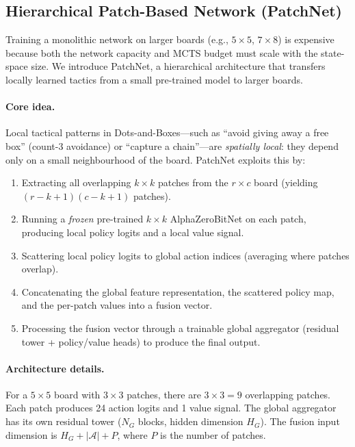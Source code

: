 \documentclass[11pt]{article}
\begin{document}
\subsection{Hierarchical Patch-Based Network (PatchNet)}
\label{sec:patchnet}

Training a monolithic network on larger boards (e.g., $5{\times}5$,
$7{\times}8$) is expensive because both the network capacity and MCTS
budget must scale with the state-space size. We introduce PatchNet, a
hierarchical architecture that transfers locally learned tactics from a
small pre-trained model to larger boards.

\paragraph{Core idea.}
Local tactical patterns in Dots-and-Boxes---such as ``avoid giving away
a free box'' (count-3 avoidance) or ``capture a chain''---are
\emph{spatially local}: they depend only on a small neighbourhood of the
board. PatchNet exploits this by:
\begin{enumerate}
  \item Extracting all overlapping $k{\times}k$ patches from the
    $r{\times}c$ board (yielding
    $(r{-}k{+}1)(c{-}k{+}1)$ patches).
  \item Running a \emph{frozen} pre-trained $k{\times}k$ AlphaZeroBitNet
    on each patch, producing local policy logits and a local value signal.
  \item Scattering local policy logits to global action indices
    (averaging where patches overlap).
  \item Concatenating the global feature representation, the scattered
    policy map, and the per-patch values into a fusion vector.
  \item Processing the fusion vector through a trainable global
    aggregator (residual tower + policy/value heads) to produce the final
    output.
\end{enumerate}

\paragraph{Architecture details.}
For a $5{\times}5$ board with $3{\times}3$ patches, there are
$3 \times 3 = 9$ overlapping patches. Each patch produces 24 action
logits and 1 value signal. The global aggregator has its own residual
tower ($N_G$ blocks, hidden dimension $H_G$). The fusion input dimension
is $H_G + |\mathcal{A}| + P$, where $P$ is the number of patches.
\end{document}
